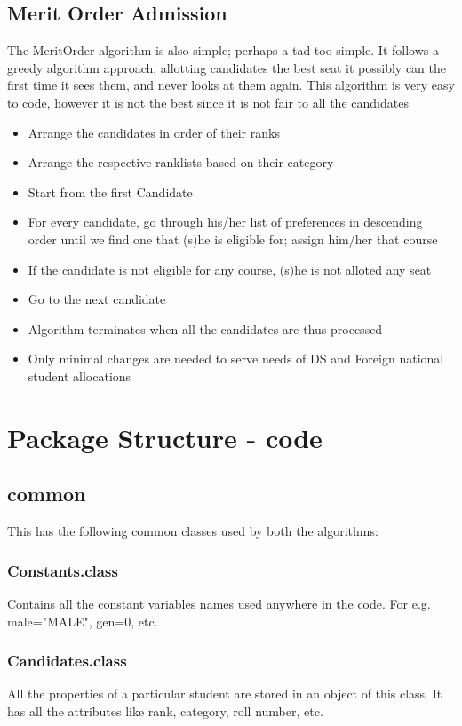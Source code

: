 \documentclass[]{report}
\begin{document}
\section{Merit Order Admission}
The MeritOrder algorithm is also simple; perhaps a tad too simple. It follows a greedy algorithm approach, allotting candidates the best seat it possibly can the first time it sees them, and never looks at them again.
This algorithm is very easy to code, however it is not the best since it is not fair to all the candidates
\begin{itemize}
\item Arrange the candidates in order of their ranks
\item Arrange the respective ranklists based on their category
\item Start from the first Candidate
\item For every candidate, go through his/her list of preferences in descending order until we find one that (s)he is eligible for; assign him/her that course
\item If the candidate is not eligible for any course, (s)he is not alloted any seat
\item Go to the next candidate
\item Algorithm terminates when all the candidates are thus processed
\item Only minimal changes are needed to serve needs of DS and Foreign national student allocations
\end{itemize}

\chapter{Package Structure - code}
\section{common}
This has the following common classes used by both the algorithms:
\subsection{Constants.class}
Contains all the constant variables names used anywhere in the code.
For e.g. male="MALE", gen=0, etc.

\subsection{Candidates.class}
All the properties of a particular student are stored in an object of this class. It has all the attributes like rank, category, roll number, etc.
\end{document}
